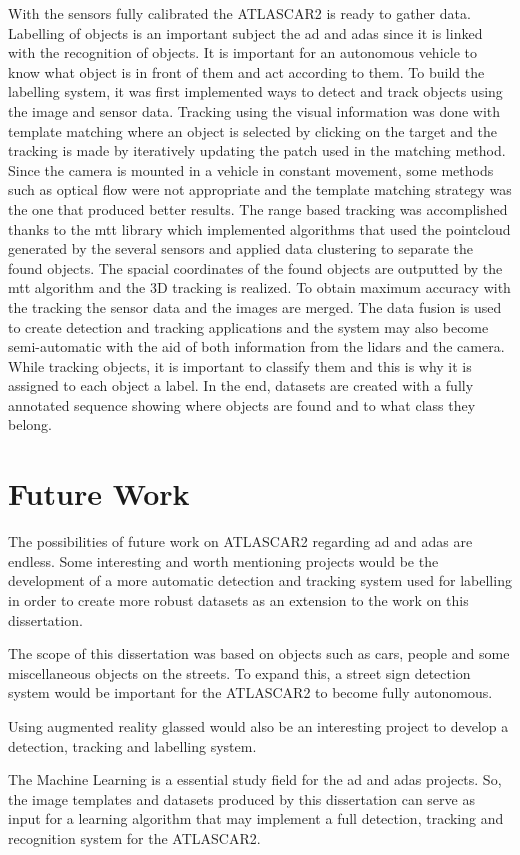With the sensors fully calibrated the ATLASCAR2 is ready to gather data. Labelling of objects is an important subject the \gls{ad} and \gls{adas} since it is linked with the recognition of objects. It is important for an autonomous vehicle to know what object is in front of them and act according to them. To build the labelling system, it was first implemented ways to detect and track objects using the image and sensor data. Tracking using the visual information was done with template matching where an object is selected by clicking on the target and the tracking is made by iteratively updating the patch used in the matching method. Since the camera is mounted in a vehicle in constant movement, some methods such as optical flow were not appropriate and the template matching strategy was the one that produced better results. The range based tracking was accomplished thanks to the \gls{mtt} library which implemented algorithms that used the pointcloud generated by the several sensors and applied data clustering to separate the found objects. The spacial coordinates of the found objects are outputted by the \gls{mtt} algorithm and the 3D tracking is realized. To obtain maximum accuracy with the tracking the sensor data and the images are merged. The data fusion is used to create detection and tracking applications and the system may also become semi-automatic with the aid of both information from the \gls{lidar}s and the camera. While tracking objects, it is important to classify them and this is why it is assigned to each object a label. In the end, datasets are created with a fully annotated sequence showing where objects are found and to what class they belong. 

\section{Future Work}

The possibilities of future work on ATLASCAR2 regarding \gls{ad} and \gls{adas} are endless. Some interesting and worth mentioning projects would be the development of a more automatic detection and tracking system used for labelling in order to create more robust datasets as an extension to the work on this dissertation. 

The scope of this dissertation was based on objects such as cars, people and some miscellaneous objects on the streets. To expand this, a street sign detection system would be important for the ATLASCAR2 to become fully autonomous.

Using augmented reality glassed would also be an interesting project to develop a detection, tracking and labelling system.

The Machine Learning is a essential study field for the \gls{ad} and \gls{adas} projects. So, the image templates and datasets produced by this dissertation can serve as input for a learning algorithm that may implement a full detection, tracking and recognition system for the ATLASCAR2.


